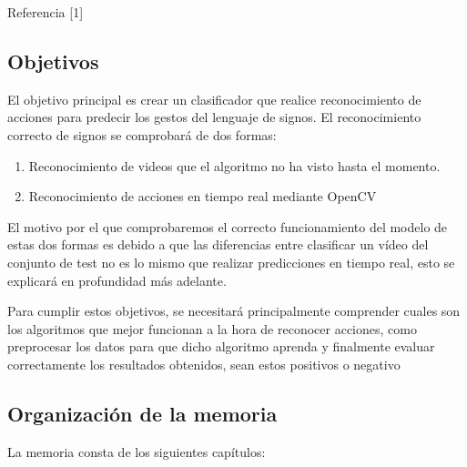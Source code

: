 \documentclass{article} %
\begin{document}
Referencia [1] 


\subsection{  Objetivos}

\noindent El objetivo principal es crear un clasificador que realice reconocimiento de acciones para predecir los gestos del lenguaje de signos. El reconocimiento correcto de signos se comprobar\'{a} de dos formas:

\noindent 

\begin{enumerate}
\item  Reconocimiento de videos que el algoritmo no ha visto hasta el momento.

\item  Reconocimiento de acciones en tiempo real mediante OpenCV
\end{enumerate}

\noindent 

\noindent El motivo por el que comprobaremos el correcto funcionamiento del modelo de estas dos formas es debido a que las diferencias entre clasificar un v\'{i}deo del conjunto de test no es lo mismo que realizar predicciones en tiempo real, esto se explicar\'{a} en profundidad m\'{a}s adelante.

\noindent 

\noindent Para cumplir estos objetivos, se necesitar\'{a} principalmente comprender cuales son los algoritmos que mejor funcionan a la hora de reconocer acciones, como preprocesar los datos para que dicho algoritmo aprenda y finalmente evaluar correctamente los resultados obtenidos, sean estos positivos o negativo


\subsection{  Organizaci\'{o}n de la memoria}

\noindent La memoria consta de los siguientes cap\'{i}tulos:
\end{document}
